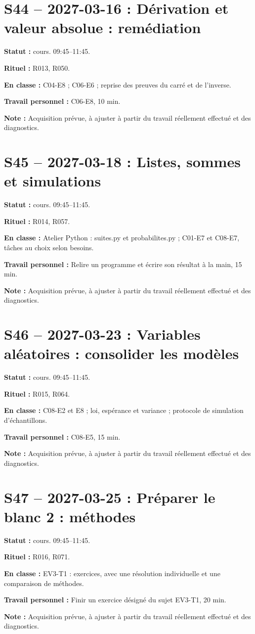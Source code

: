 \section*{S44 -- 2027-03-16 : Dérivation et valeur absolue : remédiation}
\textbf{Statut :} cours. 09:45–11:45.\par\textbf{Rituel :} R013, R050.\par\textbf{En classe :} C04-E8 ; C06-E6 ; reprise des preuves du carré et de l’inverse.\par\textbf{Travail personnel :} C06-E8, 10 min.\par\textbf{Note :} Acquisition prévue, à ajuster à partir du travail réellement effectué et des diagnostics.
\section*{S45 -- 2027-03-18 : Listes, sommes et simulations}
\textbf{Statut :} cours. 09:45–11:45.\par\textbf{Rituel :} R014, R057.\par\textbf{En classe :} Atelier Python : suites.py et probabilites.py ; C01-E7 et C08-E7, tâches au choix selon besoins.\par\textbf{Travail personnel :} Relire un programme et écrire son résultat à la main, 15 min.\par\textbf{Note :} Acquisition prévue, à ajuster à partir du travail réellement effectué et des diagnostics.
\section*{S46 -- 2027-03-23 : Variables aléatoires : consolider les modèles}
\textbf{Statut :} cours. 09:45–11:45.\par\textbf{Rituel :} R015, R064.\par\textbf{En classe :} C08-E2 et E8 ; loi, espérance et variance ; protocole de simulation d’échantillons.\par\textbf{Travail personnel :} C08-E5, 15 min.\par\textbf{Note :} Acquisition prévue, à ajuster à partir du travail réellement effectué et des diagnostics.
\section*{S47 -- 2027-03-25 : Préparer le blanc 2 : méthodes}
\textbf{Statut :} cours. 09:45–11:45.\par\textbf{Rituel :} R016, R071.\par\textbf{En classe :} EV3-T1 : exercices, avec une résolution individuelle et une comparaison de méthodes.\par\textbf{Travail personnel :} Finir un exercice désigné du sujet EV3-T1, 20 min.\par\textbf{Note :} Acquisition prévue, à ajuster à partir du travail réellement effectué et des diagnostics.
